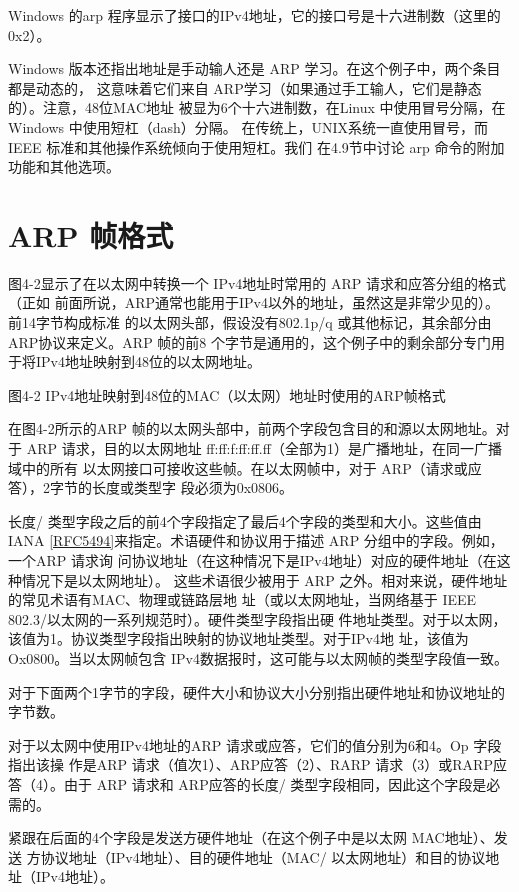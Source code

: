 Windows 的arp 程序显示了接口的IPv4地址，它的接口号是十六进制数（这里的0x2）。

Windows 版本还指出地址是手动输人还是 ARP 学习。在这个例子中，两个条目都是动态的，
这意味着它们来自 ARP学习（如果通过手工输人，它们是静态的）。注意，48位MAC地址
被显为6个十六进制数，在Linux 中使用冒号分隔，在Windows 中使用短杠（dash）分隔。
在传统上，UNIX系统一直使用冒号，而IEEE 标准和其他操作系统倾向于使用短杠。我们
在4.9节中讨论 arp 命令的附加功能和其他选项。

\section{ARP 帧格式}

图4-2显示了在以太网中转换一个 IPv4地址时常用的 ARP 请求和应答分组的格式（正如
前面所说，ARP通常也能用于IPv4以外的地址，虽然这是非常少见的）。前14字节构成标准
的以太网头部，假设没有802.1p/q 或其他标记，其余部分由 ARP协议来定义。ARP 帧的前8
个字节是通用的，这个例子中的剩余部分专门用于将IPv4地址映射到48位的以太网地址。

图4-2 IPv4地址映射到48位的MAC（以太网）地址时使用的ARP帧格式

在图4-2所示的ARP 帧的以太网头部中，前两个字段包含目的和源以太网地址。对于
ARP 请求，目的以太网地址 ff:ff:f:ff:ff.ff（全部为1）是广播地址，在同一广播域中的所有
以太网接口可接收这些帧。在以太网帧中，对于 ARP（请求或应答），2字节的长度或类型字
段必须为0x0806。

长度/ 类型字段之后的前4个字段指定了最后4个字段的类型和大小。这些值由IANA
\href{https://www.rfc-editor.org/rfc/rfc5494}{[RFC5494]}来指定。术语硬件和协议用于描述 ARP 分组中的字段。例如，一个ARP 请求询
问协议地址（在这种情况下是IPv4地址）对应的硬件地址（在这种情况下是以太网地址）。
这些术语很少被用于 ARP 之外。相对来说，硬件地址的常见术语有MAC、物理或链路层地
址（或以太网地址，当网络基于 IEEE 802.3/以太网的一系列规范时）。硬件类型字段指出硬
件地址类型。对于以太网，该值为1。协议类型字段指出映射的协议地址类型。对于IPv4地
址，该值为Ox0800。当以太网帧包含 IPv4数据报时，这可能与以太网帧的类型字段值一致。

对于下面两个1字节的字段，硬件大小和协议大小分别指出硬件地址和协议地址的字节数。

对于以太网中使用IPv4地址的ARP 请求或应答，它们的值分别为6和4。Op 字段指出该操
作是ARP 请求（值次1）、ARP应答（2）、RARP 请求（3）或RARP应答（4）。由于 ARP
请求和 ARP应答的长度/ 类型字段相同，因此这个字段是必需的。

紧跟在后面的4个字段是发送方硬件地址（在这个例子中是以太网 MAC地址）、发送
方协议地址（IPv4地址）、目的硬件地址（MAC/ 以太网地址）和目的协议地址（IPv4地址）。

